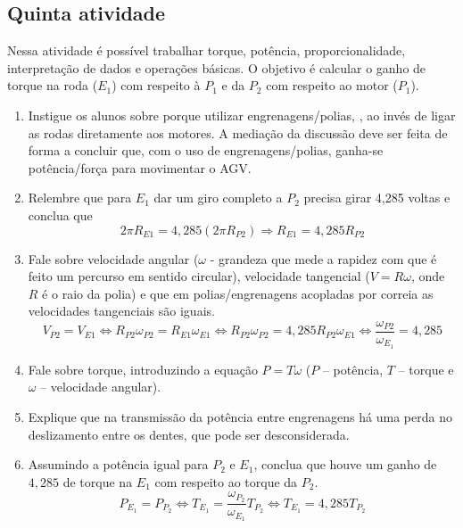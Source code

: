 \documentclass{textolivre-html}
\begin{document}
\subsection{Quinta atividade}\label{sec-quinta}
Nessa atividade é possível trabalhar torque, potência, proporcionalidade,
interpretação de dados e operações básicas. O objetivo é calcular o ganho de
torque na roda ($E_1$) com respeito à  $P_1$ e da $P_2$ com respeito ao motor
($P_1$).

\begin{enumerate}
\item Instigue os alunos sobre porque utilizar engrenagens/polias,
, ao invés de ligar as rodas diretamente aos motores. A mediação
da discussão deve ser feita de forma a concluir que, com o uso de
engrenagens/polias, ganha-se potência/força para movimentar o AGV.

\item Relembre que para $E_1$ dar um giro completo a $P_2$ precisa girar 4,285 voltas e conclua que
\begin{equation*}
2\pi R_{E1} = 4,285 (2\pi R_{P2}) \Rightarrow R_{E1} = 4,285 R_{P2}
\end{equation*}

\item Fale sobre velocidade angular ($\omega$ - grandeza que mede a rapidez com que é feito um percurso em sentido circular), velocidade tangencial ($V=R\omega$, onde $R$ é o raio da polia) e que em polias/engrenagens acopladas por correia as velocidades tangenciais são iguais.
\begin{equation*}
V_{P2} = V_{E1} \Leftrightarrow R_{P2} \omega_{P2} = R_{E1} \omega_{E1} \Leftrightarrow R_{P2} \omega_{P2} = 4,285 R_{P2} \omega_{E1} \Leftrightarrow \frac{\omega_{P2}}{\omega_{E_1}} = 4,285
\end{equation*}

\item Fale sobre torque, introduzindo a equação $P= T \omega$  ($P$ -- potência, $T$ -- torque e $\omega$ -- velocidade angular).

\item Explique que na transmissão da potência entre engrenagens há uma perda no deslizamento entre os dentes, que pode ser desconsiderada.

\item Assumindo a potência igual para $P_2$ e $E_1$, conclua que houve um ganho de $4,285$ de torque na $E_1$ com respeito ao torque da $P_2$.
\begin{equation*}
P_{E_1} = P_{P_2} \Leftrightarrow T_{E_1} = \frac{\omega_{P_2}}{\omega_{E_1}} T_{P_2} \Leftrightarrow T_{E_1} = 4,285 T_{P_2}
\end{equation*}


\end{enumerate}
\end{document}

